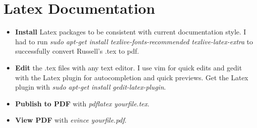 \documentclass{article}
\begin{document}
	\section{Latex Documentation}
        \begin{itemize} 
			\item \textbf{Install} Latex packages to be consistent with current documentation style. I had to run \emph{sudo apt-get install texlive-fonts-recommended texlive-latex-extra} to successfully convert Russell's .tex to pdf.
			\item \textbf{Edit} the .tex files with any text editor. I use vim for quick edits and gedit with the Latex plugin for autocompletion and quick previews. Get the Latex plugin with \emph{sudo apt-get install gedit-latex-plugin}.
            \item \textbf{Publish to PDF} with \emph{pdflatex yourfile.tex}.
			\item \textbf{View PDF} with \emph{evince yourfile.pdf}.
		\end{itemize}
\end{document}
